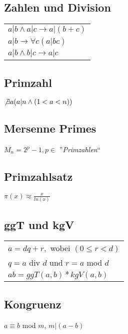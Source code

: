 \subsection{Zahlen und Division}
\begin{tabular}{l}
    $ a|b \land a|c \rightarrow a|(b + c) $ \\
    $ a|b \rightarrow \forall c(a|bc) $ \\
    $ a|b \land b|c \rightarrow a|c $ \\
\end{tabular}

\subsection{Primzahl}
$ \not \exists a (a|n \land (1 < a < n)) $

\subsection{Mersenne Primes}
$ M_n = 2^p - 1, p \in $ ''\textit{Primzahlen}``

\subsection{Primzahlsatz}
$ \pi (x) \approx \frac{x}{ln(x)} $

\subsection{ggT und kgV}
\begin{tabular}{l}
    $ a = dq + r, $ wobei $ (0 \leq r < d)$ \\
    $ q = a $ div $ d $ und $ r = a $ mod $ d $ \\
    $ ab = ggT(a, b) * kgV(a, b) $ \\
\end{tabular}

\subsection{Kongruenz}
$ a \equiv b $ mod $ m $, $ m|(a - b) $ 
